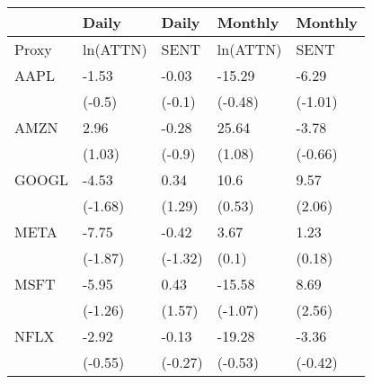 \begin{tabular}{lllll}
\toprule
{} &     Daily &    Daily &   Monthly &  Monthly \\
\midrule
Proxy &  ln(ATTN) &     SENT &  ln(ATTN) &     SENT \\
AAPL  &     -1.53 &    -0.03 &    -15.29 &    -6.29 \\
      &    (-0.5) &   (-0.1) &   (-0.48) &  (-1.01) \\
AMZN  &      2.96 &    -0.28 &     25.64 &    -3.78 \\
      &    (1.03) &   (-0.9) &    (1.08) &  (-0.66) \\
GOOGL &     -4.53 &     0.34 &      10.6 &     9.57 \\
      &   (-1.68) &   (1.29) &    (0.53) &   (2.06) \\
META  &     -7.75 &    -0.42 &      3.67 &     1.23 \\
      &   (-1.87) &  (-1.32) &     (0.1) &   (0.18) \\
MSFT  &     -5.95 &     0.43 &    -15.58 &     8.69 \\
      &   (-1.26) &   (1.57) &   (-1.07) &   (2.56) \\
NFLX  &     -2.92 &    -0.13 &    -19.28 &    -3.36 \\
      &   (-0.55) &  (-0.27) &   (-0.53) &  (-0.42) \\
\bottomrule
\end{tabular}
